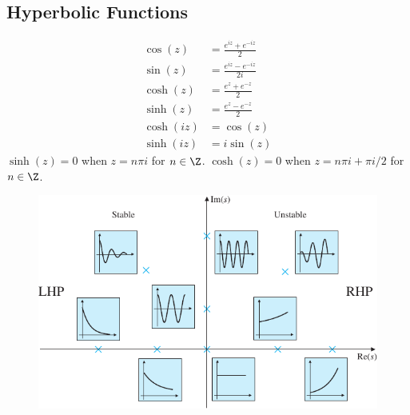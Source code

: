 \documentclass{article}
\begin{document}
\begin{multicols*}{3}
    \subsection{Hyperbolic Functions}
    \begin{align*}
        \cos{\left( z \right)}    & = \frac{e^{iz} + e^{-iz}}{2}  \\
        \sin{\left( z \right)}    & = \frac{e^{iz} - e^{-iz}}{2i} \\
        \cosh{\left( z \right)}   & = \frac{e^z + e^{-z}}{2}      \\
        \sinh{\left( z \right)}   & = \frac{e^z - e^{-z}}{2}      \\
        \cosh{\left( i z \right)} & = \cos{\left( z \right)}      \\
        \sinh{\left( i z \right)} & = i \sin{\left( z \right)}
    \end{align*}
    \(\sinh{\left( z \right)} = 0\) when \(z = n \pi i\) for \(n \in \Z\).
    \(\cosh{\left( z \right)} = 0\) when \(z = n \pi i + \pi i / 2\) for \(n \in \Z\).
    \begin{figure}[H]
        \centering
        \includegraphics[width=\linewidth,angle=90]{Figures/stabilitysplane.pdf}
    \end{figure}
\end{multicols*}
\end{document}
